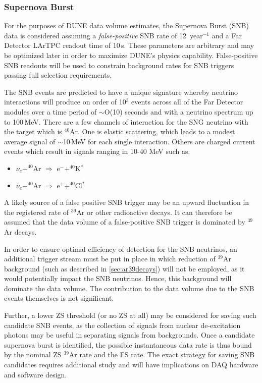 \subsubsection{Supernova Burst}
\label{sec:snb-data}
For the purposes of DUNE data volume estimates, the Supernova Burst (SNB)
data is considered assuming a
\textit{false-positive} SNB rate of 12~year$^{-1}$ and a Far Detector LArTPC
readout time of 10\,s.  These parameters are arbitrary and may be optimized later in order
to maximize DUNE's physics capability.  False-positive SNB readouts will be used to constrain
background rates for SNB triggers passing full selection requirements.

The SNB events are predicted to have a unique signature whereby
neutrino interactions will produce on order of 10$^3$ events across
all of the Far Detector modules over a time period of $\sim$O(10) seconds and with a
neutrino spectrum up to 100\,MeV. There are a few channels of interaction
for the SNG neutrino with the target which is $^{40}$Ar. One is elastic
scattering, which  leads to a modest average signal of $\sim$10\,MeV for
each single interaction. Others are charged current events which result in signals
ranging in 10-40 MeV such as:
\begin{itemize}

\item $\nu_e+^{40}$Ar $\Rightarrow$ e$^-$+$^{40}$K$^*$

\item $\bar{\nu}_e+^{40}$Ar $\Rightarrow$ e$^+$+$^{40}$Cl$^*$

\end{itemize}

A likely source of a false positive SNB trigger may be an upward
fluctuation in the registered rate of $^{39}$Ar or other radioactive decays.
It can therefore be assumed that the data volume of a
false-positive SNB trigger is dominated by $^{39}$Ar decays.

In order to ensure optimal efficiency of detection for the SNB neutrinos,
an  additional trigger stream must be put in place in which
reduction of $^{39}$Ar background (such as described in \ref{sec:ar39decays}) will not be employed,
as it would potentially impact the SNB neutrinos. Hence, this background 
will dominate the data volume. The contribution to the data volume due to the SNB events
themselves is not significant.

Further, a lower ZS threshold (or no ZS at all) may be considered for saving such candidate SNB events, as the
collection of signals from nuclear de-excitation photons may be useful in separating signals from backgrounds.
Once a candidate supernova burst is identified, the possible instantaneous data rate is thus bound by the nominal
ZS $^{39}$Ar rate and the FS rate. The exact strategy for saving SNB candidates requires additional study
and will have implications on DAQ hardware and software design.

